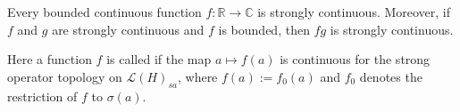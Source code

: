 Every bounded continuous function $f: \mathbb{R} \to \mathbb{C}$ is strongly continuous. Moreover, if $f$ and $g$ are strongly continuous and $f$ is bounded, then $fg$ is strongly continuous.

Here a function $f$ is called  if the map $a \mapsto f(a)$ is continuous for the strong operator topology on $\mathcal{L}(H)_{sa}$, where $f(a) := f_0(a)$ and $f_0$ denotes the restriction of $f$ to $\sigma(a)$.

